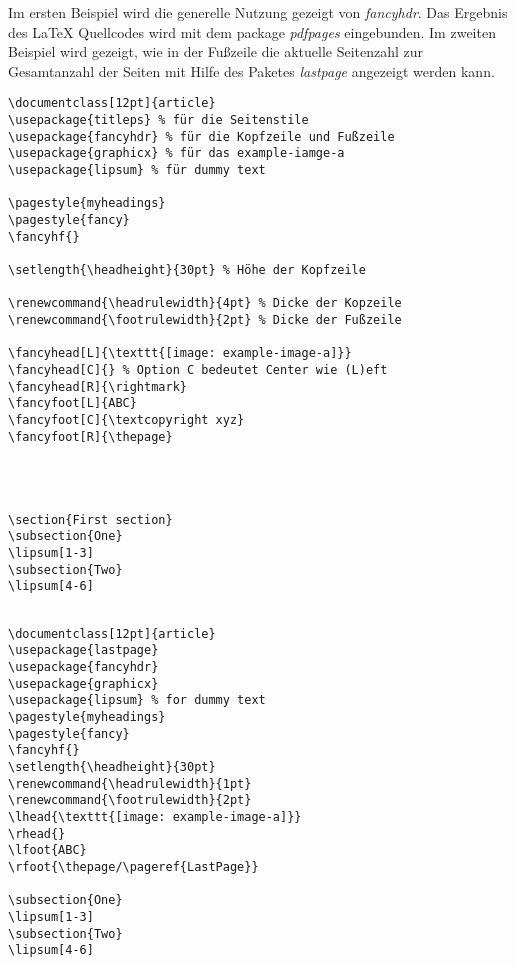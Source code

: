 Im ersten Beispiel wird die generelle Nutzung gezeigt von \emph{fancyhdr}. Das Ergebnis des LaTeX Quellcodes wird mit dem package \emph{pdfpages} eingebunden. Im zweiten Beispiel wird gezeigt, wie in der Fußzeile die aktuelle Seitenzahl zur Gesamtanzahl der Seiten mit Hilfe des Paketes \emph{lastpage} angezeigt werden kann.
\newpage
\begin{lstlisting}[style=LaTeX]
\documentclass[12pt]{article}
\usepackage{titleps} % für die Seitenstile
\usepackage{fancyhdr} % für die Kopfzeile und Fußzeile
\usepackage{graphicx} % für das example-iamge-a
\usepackage{lipsum} % für dummy text

\pagestyle{myheadings}
\pagestyle{fancy}
\fancyhf{}

\setlength{\headheight}{30pt} % Höhe der Kopfzeile

\renewcommand{\headrulewidth}{4pt} % Dicke der Kopzeile
\renewcommand{\footrulewidth}{2pt} % Dicke der Fußzeile

\fancyhead[L]{\texttt{[image: example-image-a]}}
\fancyhead[C]{} % Option C bedeutet Center wie (L)eft
\fancyhead[R]{\rightmark}
\fancyfoot[L]{ABC}
\fancyfoot[C]{\textcopyright xyz}
\fancyfoot[R]{\thepage}




\section{First section}
\subsection{One}
\lipsum[1-3]
\subsection{Two}
\lipsum[4-6]


\end{lstlisting}

 

\begin{lstlisting}[style=LaTeX]
\documentclass[12pt]{article}
\usepackage{lastpage}
\usepackage{fancyhdr}
\usepackage{graphicx}
\usepackage{lipsum} % for dummy text
\pagestyle{myheadings}
\pagestyle{fancy}
\fancyhf{}
\setlength{\headheight}{30pt}
\renewcommand{\headrulewidth}{1pt}
\renewcommand{\footrulewidth}{2pt}
\lhead{\texttt{[image: example-image-a]}}
\rhead{}
\lfoot{ABC}
\rfoot{\thepage/\pageref{LastPage}}

\subsection{One}
\lipsum[1-3]
\subsection{Two}
\lipsum[4-6]

\end{lstlisting}

 
